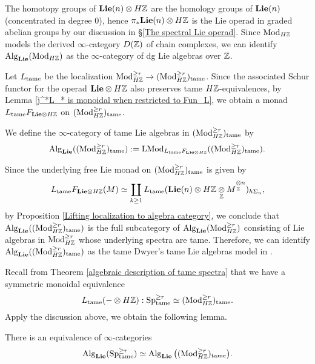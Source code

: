 \begin{remark}
The homotopy groups of $\spLie(n)\otimes H\BZ$ are the homology groups of $\spLie(n)$ (concentrated in degree $0$), hence $\pi_* \spLie(n)\otimes H\BZ$ is the Lie operad in graded abelian groups by our discussion in \S \ref{The spectral Lie operad}.
Since $\Mod_{H\BZ}$ models the derived $\infty$-category $D(\BZ)$ of chain complexes, we can identify 
$\Alg_{\spLie}(\Mod_{H\BZ})$ as the $\infty$-category of dg Lie algebras over $\BZ$.
\end{remark}

Let $L_{\tame}$ be the localization $\Mod_{H\BZ}^{\geq r} \to (\Mod_{H\BZ}^{\geq r})_{\tame}$. Since the associated Schur functor for the operad $\spLie\otimes H\BZ$ also preserves tame $H\BZ$-equivalences, by Lemma \ref{j^*L_* is monoidal when restricted to Fun_L}, we obtain a monad $L_{\tame}F_{\spLie \otimes H\BZ}$ on $(\Mod_{H\BZ}^{\geq r})_{\tame}$.

\begin{definition}
We define the $\infty$-category of tame Lie algebras in $(\Mod_{H\BZ}^{\geq r})_{\tame}$ by 
$$
\Alg_{\spLie}((\Mod_{H\BZ}^{\geq r})_{\tame}): = \LMod_{L_{\tame}F_{\spLie \otimes H\BZ}}((\Mod_{H\BZ}^{\geq r})_{\tame}).
$$
\end{definition}
\begin{remark}
\label{Identify tame Lie algebra with Dwyer's Lie algebra}
Since the underlying free Lie monad on $(\Mod_{H\BZ}^{\geq r})_{\tame}$ is given by
$$
L_{\tame}F_{\spLie \otimes H\BZ}(M)
\simeq \coprod_{k\geq 1} 
L_{\tame}(\spLie(n)\otimes H\BZ \underset{\BZ}{\otimes} M^{\underset{\BZ}{\otimes}n})_{h\Sigma_n},
$$
by Proposition \ref{Lifting localization to algebra category}, we conclude that $\Alg_{\spLie}((\Mod_{H\BZ}^{\geq r})_{\tame})$ is the full subcategory of 
$\Alg_{\spLie}(\Mod^{\geq r}_{H\BZ})$ consisting of Lie algebras in $\Mod^{\geq r}_{H\BZ}$ whose underlying spectra are tame.
Therefore, we can identify $\Alg_{\spLie}((\Mod_{H\BZ}^{\geq r})_{\tame})$ as the tame Dwyer's tame Lie algebras model in \cite{Dwyer}.
\end{remark}

Recall from Theorem \ref{algebraic description of tame spectra} that we have a symmetric monoidal equivalence
$$
L_{\tame}(-\otimes H\BZ):
\Sp^{\geq r}_{\tame} \simeq
(\Mod_{H\BZ}^{\geq r})_{\tame}.
$$
Apply the discussion above, we obtain the following lemma.
\begin{lemma}
There is an equivalence of $\infty$-categories
$$
\Alg_{\spLie}(\Sp^{\geq r}_{\tame}) \simeq \Alg_{\spLie}\big((\Mod_{H\BZ}^{\geq r})_{\tame}\big).
$$
\end{lemma}

